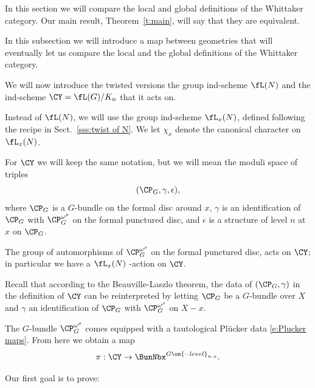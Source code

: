 \documentclass[9pt]{amsart}
\theoremstyle{definition}
\theoremstyle{remark}
\newcommand{\thmref}[1]{Theorem~\ref{#1}}
\newcommand{\secref}[1]{Sect.~\ref{#1}}
\numberwithin{equation}{section}
\begin{document}
In this section we will compare the local and global definitions of the Whittaker category. Our main result,
\thmref{t:main}, will say that they are equivalent. 


In this subsection we will introduce a map between geometries that will eventually let us compare the local
and the global definitions of the Whittaker category. 

\sssec{}

We will now introduce the twisted versions the group ind-scheme $\fL(N)$ and the ind-scheme 
$\CY=\fL(G)/K_n$ that it acts on.

\medskip

Instead of $\fL(N)$, we will use the group ind-scheme $\fL_x(N)$, defined following the recipe in \secref{sss:twist of N}. We let
$\chi_x$ denote the canonical character on $\fL_x(N)$. 

\medskip

For $\CY$ we will keep the same notation, but we will mean the moduli space of triples
$$(\CP_G,\gamma,\epsilon),$$
where $\CP_G$ is a $G$-bundle on the formal disc around $x$, $\gamma$ is an identification of $\CP_G$ with 
$\CP^{\omega^\rho}_G$ on the formal punctured disc, and $\epsilon$ is a structure of level $n$ at $x$ on $\CP_G$. 

\medskip

The group of automorphisms of $\CP^{\omega^\rho}_G$ on the formal punctured disc, %
acts on $\CY$; in particular we have a $\fL_x(N)$ -action on $\CY$.

\sssec{}  \label{sss:map pi}

Recall that according to the Beauville-Laszlo theorem, the data of $(\CP_G,\gamma)$ in the definition of $\CY$
can be reinterpreted by letting $\CP_G$ be a $G$-bundle over $X$ and $\gamma$ an identification of $\CP_G$ with 
$\CP^{\omega^\rho}_G$ on $X-x$. 

\medskip

The $G$-bundle $\CP^{\omega^\rho}_G$ comes equipped with a tautological Pl\"ucker data \eqref{e:Plucker maps}.
From here we obtain a map
\begin{equation} \label{e:map pi}
\pi:\CY\to \BunNbx^{G\on{-level}_{n\cdot x}}.
\end{equation} 

\sssec{}

Our first goal is to prove:
\end{document}

